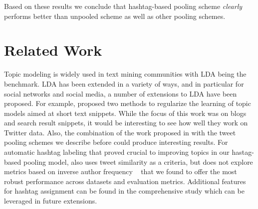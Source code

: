 \documentclass{sig-alternate}
\begin{document}
Based on these results we conclude that hashtag-based pooling scheme
\emph{clearly} performs better than unpooled scheme as well as other
pooling schemes.

\section{Related Work}

\label{sec:related_work}
Topic modeling is widely used in text mining communities with LDA
being the benchmark.  LDA has been extended in a variety of ways, and
in particular for social networks and social media, a number of
extensions to LDA have been proposed.  For example, \cite{newman11}
proposed two methods to regularize the learning of topic models aimed
at short text snippets. While the focus of this work was on blogs and
search result snippets, it would be interesting to see how well they
work on Twitter data.  Also, the combination of the work proposed in
\cite{newman11} with the tweet pooling schemes we describe before
could produce interesting results. For automatic
 hashtag labeling that proved crucial to improving topics in our hastag-based pooling model, \cite{zangerle2011recommending} also uses tweet similarity as a
criteria, but does not explore metrics based on inverse author
frequency ~\cite{iaf} that we found to offer the most robust
performance across datasets and evaluation metrics. Additional features  for hashtag assignment can be found in the comprehensive study \cite{yang2012www} which can be leveraged in future extensions.
\end{document}
